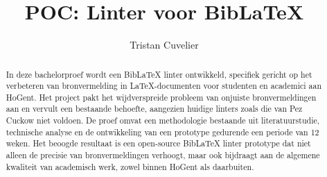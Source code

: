 \documentclass{hogent-article}
\title{POC: Linter voor BibLaTeX}
\author{Tristan Cuvelier}
\begin{document}
\begin{abstract}
  

  In deze bachelorproef wordt een BibLaTeX linter ontwikkeld, specifiek gericht op het verbeteren van bronvermelding in LaTeX-documenten voor studenten en academici aan HoGent. 
  Het project pakt het wijdverspreide probleem van onjuiste bronvermeldingen aan en vervult een bestaande behoefte, aangezien huidige linters zoals die van Pez Cuckow niet voldoen.
  De proef omvat een methodologie bestaande uit literatuurstudie, technische analyse en de ontwikkeling van een prototype gedurende een periode van 12 weken. Het beoogde resultaat 
  is een open-source BibLaTeX linter prototype dat niet alleen de precisie van bronvermeldingen verhoogt, maar ook bijdraagt aan de algemene kwaliteit van academisch werk, zowel binnen 
  HoGent als daarbuiten.

\end{abstract}

\tableofcontents



\printbibliography[heading=bibintoc]
\end{document}
